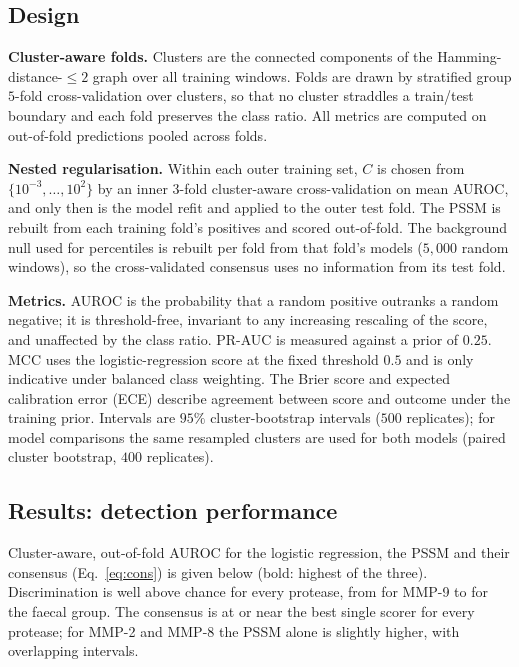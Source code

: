 \subsection{Design}

\textbf{Cluster-aware folds.} Clusters are the connected components of the
Hamming-distance-$\le2$ graph over all training windows. Folds
are drawn by stratified group $5$-fold cross-validation over clusters, so that no
cluster straddles a train/test boundary and each fold preserves the class
ratio. All metrics are computed on out-of-fold predictions pooled across folds.

\textbf{Nested regularisation.} Within each outer training set, $C$ is chosen
from $\{10^{-3},\dots,10^{2}\}$ by an inner $3$-fold cluster-aware
cross-validation on mean AUROC, and only then is the model refit and applied to
the outer test fold. The PSSM is rebuilt from each training fold's positives
and scored out-of-fold. The background null used for percentiles is rebuilt per
fold from that fold's models ($5{,}000$ random windows), so the cross-validated
consensus uses no information from its test fold.

\textbf{Metrics.} AUROC is the probability that a random positive outranks a
random negative; it is threshold-free, invariant to any increasing rescaling of
the score, and unaffected by the class ratio. PR-AUC is measured against a
prior of $0.25$. MCC uses the logistic-regression score at the fixed threshold
$0.5$ and is only indicative under balanced class weighting. The Brier score
and expected calibration error (ECE) describe agreement between score and
outcome under the training prior. Intervals are $95\%$ cluster-bootstrap
intervals ($500$ replicates); for model comparisons the same resampled clusters
are used for both models (paired cluster bootstrap, $400$ replicates).

\subsection{Results: detection performance}

Cluster-aware, out-of-fold AUROC for the logistic regression, the PSSM and their
consensus (Eq.~\ref{eq:cons}) is given below (bold: highest of the three).
Discrimination is well above chance for every protease, from \aucConsMMPnine{}
for MMP-9 to \aucConsFaecal{} for the faecal group. The consensus is at or near
the best single scorer for every protease; for MMP-2 and MMP-8 the PSSM alone
is slightly higher, with overlapping intervals.

